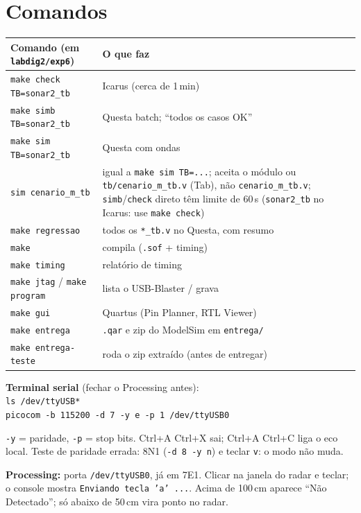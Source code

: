\documentclass[9pt,a4paper]{extarticle}
\newcommand{\s}[1]{\texttt{#1}}          %
\begin{document}
\section{Comandos}

\begin{minipage}[t]{0.50\linewidth}
\vspace{0pt}
\begin{tabularx}{\linewidth}{@{}l Y@{}}
\toprule
Comando (em \s{labdig2/exp6}) & O que faz \\
\midrule
\s{make check TB=sonar2\_tb} & Icarus (cerca de 1\,min) \\
\s{make simb TB=sonar2\_tb} & Questa batch; ``todos os casos OK'' \\
\s{make sim TB=sonar2\_tb} & Questa com ondas \\
\s{sim cenario\_m\_tb} & igual a \s{make sim TB=...}; aceita o módulo ou \s{tb/cenario\_m\_tb.v} (Tab), não \s{cenario\_m\_tb.v}; \s{simb}/\s{check} direto têm limite de 60\,s (\s{sonar2\_tb} no Icarus: use \s{make check}) \\
\s{make regressao} & todos os \s{*\_tb.v} no Questa, com resumo \\
\s{make} & compila (\s{.sof} + timing) \\
\s{make timing} & relatório de timing \\
\s{make jtag} / \s{make program} & lista o USB-Blaster / grava \\
\s{make gui} & Quartus (Pin Planner, RTL Viewer) \\
\s{make entrega} & \s{.qar} e zip do ModelSim em \s{entrega/} \\
\s{make entrega-teste} & roda o zip extraído (antes de entregar) \\
\bottomrule
\end{tabularx}
\end{minipage}\hfill
\begin{minipage}[t]{0.47\linewidth}
\vspace{0pt}
\textbf{Terminal serial} (fechar o Processing antes):\\
\s{ls /dev/ttyUSB*}\\
\s{picocom -b 115200 -d 7 -y e -p 1 /dev/ttyUSB0}

\s{-y} = paridade, \s{-p} = stop bits. Ctrl+A Ctrl+X sai; Ctrl+A Ctrl+C liga o
eco local. Teste de paridade errada: 8N1 (\s{-d 8 -y n}) e teclar \s{v}: o modo
não muda.

\textbf{Processing:} porta \s{/dev/ttyUSB0}, já em 7E1. Clicar na janela do
radar e teclar; o console mostra \s{Enviando tecla 'a' ...}. Acima de 100\,cm
aparece ``Não Detectado''; só abaixo de 50\,cm vira ponto no radar.
\end{minipage}
\end{document}
